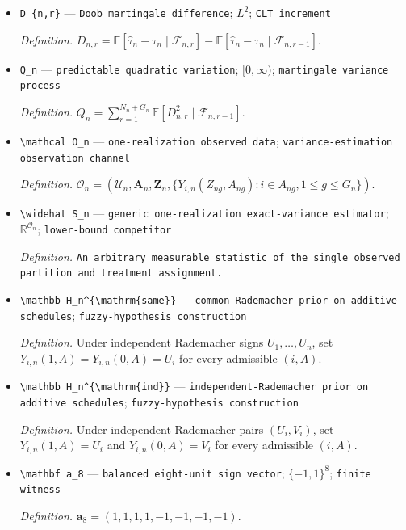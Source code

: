 \documentclass{article}
\begin{document}
\begin{itemize}
  \item \texttt{D\_\allowbreak{}\{n,\allowbreak{}r\}\allowbreak{}} --- \texttt{Doob martingale difference}; \(L^2\); \texttt{CLT increment}
  \par\smallskip\noindent\emph{Definition.} \(D_{n,r}=\mathbb E[\widehat\tau_n-\tau_n\mid\mathcal F_{n,r}]-\mathbb E[\widehat\tau_n-\tau_n\mid\mathcal F_{n,r-1}]\).
  \item \texttt{Q\_\allowbreak{}n} --- \texttt{predictable quadratic variation}; \([0,\infty)\); \texttt{martingale variance process}
  \par\smallskip\noindent\emph{Definition.} \(Q_n=\sum_{r=1}^{N_n+G_n}\mathbb E[D_{n,r}^2\mid\mathcal F_{n,r-1}]\).
  \item \texttt{\textbackslash{}\allowbreak{}mathcal O\_\allowbreak{}n} --- \texttt{one-\allowbreak{}realization observed data}; \texttt{variance-\allowbreak{}estimation observation channel}
  \par\smallskip\noindent\emph{Definition.} \(\mathcal O_n=(\mathcal U_n,\mathbf A_n,\mathbf Z_n,\{Y_{i,n}(Z_{ng},A_{ng}):i\in A_{ng},1\le g\le G_n\})\).
  \item \texttt{\textbackslash{}\allowbreak{}widehat S\_\allowbreak{}n} --- \texttt{generic one-\allowbreak{}realization exact-\allowbreak{}variance estimator}; \(\mathbb R^{\mathcal O_n}\); \texttt{lower-\allowbreak{}bound competitor}
  \par\smallskip\noindent\emph{Definition.} \texttt{An arbitrary measurable statistic of the single observed partition and treatment assignment.}
  \item \texttt{\textbackslash{}\allowbreak{}mathbb H\_\allowbreak{}n\textasciicircum{}\{\textbackslash{}\allowbreak{}mathrm\{same\}\allowbreak{}\}\allowbreak{}} --- \texttt{common-\allowbreak{}Rademacher prior on additive schedules}; \texttt{fuzzy-\allowbreak{}hypothesis construction}
  \par\smallskip\noindent\emph{Definition.} Under independent Rademacher signs \(U_1,\ldots,U_n\), set \(Y_{i,n}(1,A)=Y_{i,n}(0,A)=U_i\) for every admissible \((i,A)\).
  \item \texttt{\textbackslash{}\allowbreak{}mathbb H\_\allowbreak{}n\textasciicircum{}\{\textbackslash{}\allowbreak{}mathrm\{ind\}\allowbreak{}\}\allowbreak{}} --- \texttt{independent-\allowbreak{}Rademacher prior on additive schedules}; \texttt{fuzzy-\allowbreak{}hypothesis construction}
  \par\smallskip\noindent\emph{Definition.} Under independent Rademacher pairs \((U_i,V_i)\), set \(Y_{i,n}(1,A)=U_i\) and \(Y_{i,n}(0,A)=V_i\) for every admissible \((i,A)\).
  \item \texttt{\textbackslash{}\allowbreak{}mathbf a\_\allowbreak{}8} --- \texttt{balanced eight-\allowbreak{}unit sign vector}; \(\{-1,1\}^8\); \texttt{finite witness}
  \par\smallskip\noindent\emph{Definition.} \(\mathbf a_8=(1,1,1,1,-1,-1,-1,-1)\).
\end{itemize}
\end{document}
